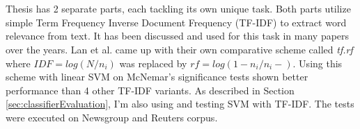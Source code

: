 \\
\\
Thesis has 2 separate parts, each tackling its own unique task. Both parts utilize simple Term Frequency Inverse Document Frequency (TF-IDF) to extract word relevance from text. It has been discussed and used for this task in many papers over the years. Lan et al. \cite{lan2005comprehensive} came up with their own comparative scheme called \textit{tf.rf} where $IDF=log(N/n_i)$ was replaced by $rf=log(1-n_i/n_i-)$. Using this scheme with linear SVM on McNemar's significance tests \cite{dietterich1998approximate} shown better performance than 4 other TF-IDF variants. As described in Section \ref{sec:classifierEvaluation}, I'm also using and testing SVM with TF-IDF. The tests were executed on Newsgroup and Reuters corpus.